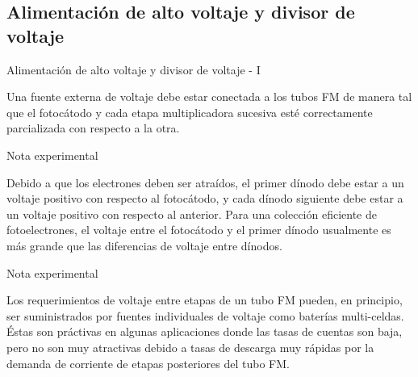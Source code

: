 \documentclass[a4paper,10pt]{beamer}
\begin{document}
\subsection{Alimentación de alto voltaje y divisor de voltaje}
\begin{frame}{Alimentación de alto voltaje y divisor de voltaje - I}
  
 \begin{justify} 
 Una fuente externa de voltaje debe estar conectada a los tubos FM de manera tal que 
 el fotocátodo y cada etapa multiplicadora sucesiva esté correctamente parcializada 
 con respecto a la otra.
 
 \begin{exampleblock}{Nota experimental}
 \begin{justify}
   Debido a que los electrones deben ser atraídos, el primer dínodo debe estar a 
  un voltaje positivo con respecto al fotocátodo, y cada dínodo siguiente debe estar 
  a un voltaje positivo con respecto al anterior. Para una colección eficiente de 
  fotoelectrones, el voltaje entre el fotocátodo y el primer dínodo usualmente 
  es más grande que las diferencias de voltaje entre dínodos.
  \end{justify}
 \end{exampleblock}
 
\begin{exampleblock}{Nota experimental}
 \begin{justify}
  Los requerimientos de voltaje entre etapas de un tubo FM pueden, en principio, 
  ser suministrados por fuentes individuales de voltaje como baterías multi-celdas.
  Éstas son práctivas en algunas aplicaciones donde las tasas de cuentas son baja, pero 
  no son muy atractivas debido a tasas de descarga muy rápidas por la demanda 
  de corriente de etapas posteriores del tubo FM.
  \end{justify}
 \end{exampleblock}
 
 \end{justify}
\end{frame}
\end{document}
